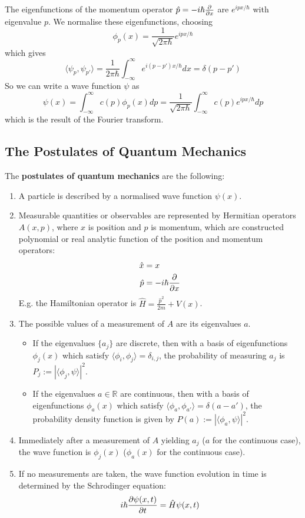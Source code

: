 \begin{example}
	The eigenfunctions of the momentum operator $\hat{p} = -i \hbar \diffp{}{x}$ are $e^{ipx / \hbar}$ with eigenvalue $p$. We normalise these eigenfunctions, choosing
	\[
		\phi_p(x) = \frac{1}{\sqrt{2 \pi \hbar}} e^{ipx / \hbar}
	\]
	which gives
	\[
		\langle \psi_p, \psi_{p'} \rangle = \frac{1}{2 \pi \hbar} \int_{-\infty}^{\infty} e^{i(p - p')x / \hbar} dx = \delta(p - p')
	\]
	So we can write a wave function $\psi$ as
	\[
		\psi(x) = \int_{-\infty}^{\infty} c(p) \phi_p(x) dp = \frac{1}{\sqrt{2 \pi \hbar}} \int_{-\infty}^{\infty} c(p) e^{ipx / \hbar} dp
	\]
	which is the result of the Fourier transform.
\end{example}

\subsection{The Postulates of Quantum Mechanics}

\begin{definition}
	The \textbf{postulates of quantum mechanics} are the following:
	\begin{enumerate}
		\item A particle is described by a normalised wave function $\psi(x)$.
		\item Measurable quantities or observables are represented by Hermitian operators $A(x, p)$, where $x$ is position and $p$ is momentum, which are constructed polynomial or real analytic function of the position and momentum operators:
		\[
			\begin{aligned}
				\hat{x} & = x \\
				\hat{p} & = -i \hbar \diffp{}{x}
			\end{aligned}
		\]
		E.g. the Hamiltonian operator is $\hat{H} = \frac{\hat{p}^2}{2m} + V(x)$.
		\item The possible values of a measurement of $A$ are its eigenvalues $a$.
		\begin{itemize}
			\item If the eigenvalues $\{ a_j \}$ are discrete, then with a basis of eigenfunctions $\phi_j(x)$ which satisfy $\langle \phi_i, \phi_j \rangle = \delta_{i, j}$, the probability of measuring $a_j$ is $P_j := |\langle \phi_j, \psi \rangle|^2$.
			\item If the eigenvalues $a \in \mathbb{R}$ are continuous, then with a basis of eigenfunctions $\phi_a(x)$ which satisfy $\langle \phi_a, \phi_{a'} \rangle = \delta(a - a')$, the probability density function is given by $P(a) := |\langle \phi_a, \psi \rangle|^2$.
		\end{itemize}
		\item Immediately after a measurement of $A$ yielding $a_j$ ($a$ for the continuous case), the wave function is $\phi_j(x)$ ($\phi_a(x)$ for the continuous case).
		\item If no measurements are taken, the wave function evolution in time is determined by the Schrodinger equation:
		\[
			i \hbar \diffp{\psi(x, t)}{t} = \hat{H} \psi(x, t)
		\]
	\end{enumerate}
\end{definition}

